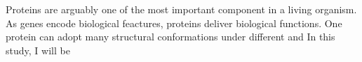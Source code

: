 Proteins are arguably one of the most important component in a living organism. As genes encode biological feactures, proteins deliver biological functions. One protein can adopt many structural conformations under different and   In this study, I will be 